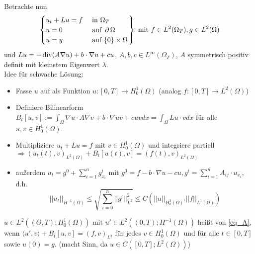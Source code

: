 \mbox{} \\
Betrachte nun
\begin{equation} \left. \begin{cases}
	u_t + Lu = f & \text{ in } \Omega_T \\
	u = 0 & \text{ auf } \operatorname{\partial} \Omega \\
	u = y & \text{ auf } \{0\} \times \Omega \end{cases} \right\} \text{ mit } f \in L^2(\Omega_T), g \in L^2(\Omega) \label{eq_A} \end{equation}
und $Lu = -\operatorname{div} (A \nabla u) + b \cdot \nabla u + cu$, $A,b,c \in L^\infty(\Omega_T)$, $A$ symmetrisch positiv definit mit kleinstem Eigenwert $\lambda$. \\
Idee für schwache Lösung: \begin{itemize}
	\item Fasse $u$ auf als Funktion $u\colon [0,T] \rightarrow H_0^1(\Omega)$ (analog $f \colon [0,T] \rightarrow L^2(\Omega)$)
	\item Definiere Bilinearform $B_t[u,v] := \int_{\Omega} \nabla u \cdot A \nabla v + b \cdot \nabla uv + cuv dx = \int_{\Omega} Lu \cdot v dx$ für alle $u,v \in H_0^1(\Omega)$.
	\item Multipliziere $u_t + Lu = f$ mit $v \in H_0^1(\Omega)$ und integriere partiell \\
	$\Rightarrow (u_t(t),v)_{L^2(\Omega)} + B_t[u(t),v] = (f(t),v)_{L^2(\Omega)}$
	\item außerdem $u_t = g^0 + \sum_{i=1}^{n} g_{x_i}^i$ mit $g^0 = f - b \cdot \nabla u - cu, g^i = \sum_{i=1}^{n} A_{ij} \cdot u_{x_i}$, d.h.
	\[ ||u_t||_{H^{-1}(\Omega)} \leq \sqrt{ \sum_{i=0}^{n} ||g^i||_{L^2}^2} \leq C( ||u||_{H_0^1(\Omega)^t} ||f||_{L^1(\Omega)}) \]
\end{itemize}
$u \in L^2((O,T);H_0^1(\Omega))$ mit $u' \in L^2((0,T);H^{-1}(\Omega))$ heißt  von \eqref{eq_A}, wenn $\langle u',v \rangle + B_t[u,v] = (f,v)_{L^2}$ für jedes $v \in H_0^1(\Omega)$ und für alle $t \in [0,T]$ sowie $u(0) = g$. (macht Sinn, da $u \in C([0,T];L^2(\Omega))$)

